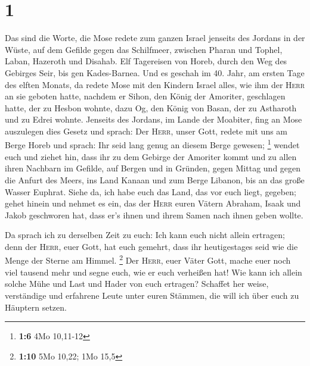 \hypertarget{section}{%
\section{1}\label{section}}

 Das sind die Worte, die Mose redete zum ganzen Israel
jenseits des Jordans in der Wüste, auf dem Gefilde gegen das Schilfmeer,
zwischen Pharan und Tophel, Laban, Hazeroth und Disahab. 
Elf Tagereisen von Horeb, durch den Weg des Gebirges Seir, bis gen
Kades-Barnea.  Und es geschah im 40. Jahr, am ersten Tage
des elften Monats, da redete Mose mit den Kindern Israel alles, wie ihm
der \textsc{Herr} an sie geboten hatte,  nachdem er Sihon,
den König der Amoriter, geschlagen hatte, der zu Hesbon wohnte, dazu Og,
den König von Basan, der zu Astharoth und zu Edrei wohnte.
 Jenseits des Jordans, im Lande der Moabiter, fing an Mose
auszulegen dies Gesetz und sprach:  Der \textsc{Herr},
unser Gott, redete mit uns am Berge Horeb und sprach: Ihr seid lang
genug an diesem Berge gewesen; \footnote{\textbf{1:6} 4Mo 10,11-12}
 wendet euch und ziehet hin, dass ihr zu dem Gebirge der
Amoriter kommt und zu allen ihren Nachbarn im Gefilde, auf Bergen und in
Gründen, gegen Mittag und gegen die Anfurt des Meers, ins Land Kanaan
und zum Berge Libanon, bis an das große Wasser Euphrat. 
Siehe da, ich habe euch das Land, das vor euch liegt, gegeben; gehet
hinein und nehmet es ein, das der \textsc{Herr} euren Vätern Abraham,
Isaak und Jakob geschworen hat, dass er's ihnen und ihrem Samen nach
ihnen geben wollte.

 Da sprach ich zu derselben Zeit zu euch: Ich kann euch
nicht allein ertragen;  denn der \textsc{Herr}, euer
Gott, hat euch gemehrt, dass ihr heutigestages seid wie die Menge der
Sterne am Himmel. \footnote{\textbf{1:10} 5Mo 10,22; 1Mo 15,5}
 Der \textsc{Herr}, euer Väter Gott, mache euer noch viel
tausend mehr und segne euch, wie er euch verheißen hat! 
Wie kann ich allein solche Mühe und Last und Hader von euch ertragen?
 Schaffet her weise, verständige und erfahrene Leute
unter euren Stämmen, die will ich über euch zu Häuptern setzen.


